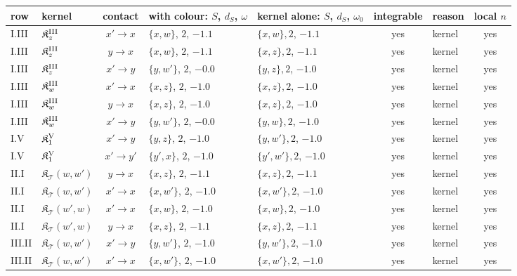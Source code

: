 {\footnotesize
\begin{center}
\renewcommand{\arraystretch}{1.12}\setlength{\tabcolsep}{2pt}
\begin{tabular}{|l|l|c|l|l|c|l|c|}\hline
row & kernel & contact & with colour: $S$, $d_S$, $\omega$ & kernel alone: $S$, $d_S$, $\omega_0$ & integrable & reason & local $n$\\\hline
I.III & $\mathfrak K^{\rm III}_z$ & $x'\to x$ & $\{x,w\}$, $2$, $-1.1$ & $\{x,w\}, 2$, $-1.1$ & yes & kernel & yes\\
I.III & $\mathfrak K^{\rm III}_z$ & $y\to x$ & $\{x,w\}$, $2$, $-1.1$ & $\{x,z\}, 2$, $-1.1$ & yes & kernel & yes\\
I.III & $\mathfrak K^{\rm III}_z$ & $x'\to y$ & $\{y,w'\}$, $2$, $-0.0$ & $\{y,z\}, 2$, $-1.0$ & yes & kernel & yes\\
I.III & $\mathfrak K^{\rm III}_w$ & $x'\to x$ & $\{x,z\}$, $2$, $-1.0$ & $\{x,z\}, 2$, $-1.0$ & yes & kernel & yes\\
I.III & $\mathfrak K^{\rm III}_w$ & $y\to x$ & $\{x,z\}$, $2$, $-1.0$ & $\{x,z\}, 2$, $-1.0$ & yes & kernel & yes\\
I.III & $\mathfrak K^{\rm III}_w$ & $x'\to y$ & $\{y,w'\}$, $2$, $-0.0$ & $\{y,w\}, 2$, $-1.0$ & yes & kernel & yes\\
I.V & $\mathfrak K^{\rm V}_1$ & $x'\to y$ & $\{y,z\}$, $2$, $-1.0$ & $\{y,w'\}, 2$, $-1.0$ & yes & kernel & yes\\
I.V & $\mathfrak K^{\rm V}_1$ & $x'\to y'$ & $\{y',x\}$, $2$, $-1.0$ & $\{y',w'\}, 2$, $-1.0$ & yes & kernel & yes\\
II.I & $\mathfrak K_{\mathcal T}(w,w')$ & $y\to x$ & $\{x,z\}$, $2$, $-1.1$ & $\{x,z\}, 2$, $-1.1$ & yes & kernel & yes\\
II.I & $\mathfrak K_{\mathcal T}(w,w')$ & $x'\to x$ & $\{x,w'\}$, $2$, $-1.0$ & $\{x,w'\}, 2$, $-1.0$ & yes & kernel & yes\\
II.I & $\mathfrak K_{\mathcal T}(w',w)$ & $x'\to x$ & $\{x,w\}$, $2$, $-1.0$ & $\{x,w\}, 2$, $-1.0$ & yes & kernel & yes\\
II.I & $\mathfrak K_{\mathcal T}(w',w)$ & $y\to x$ & $\{x,z\}$, $2$, $-1.1$ & $\{x,z\}, 2$, $-1.1$ & yes & kernel & yes\\
III.II & $\mathfrak K_{\mathcal T}(w,w')$ & $x'\to y$ & $\{y,w'\}$, $2$, $-1.0$ & $\{y,w'\}, 2$, $-1.0$ & yes & kernel & yes\\
III.II & $\mathfrak K_{\mathcal T}(w,w')$ & $x'\to x$ & $\{x,w'\}$, $2$, $-1.0$ & $\{x,w'\}, 2$, $-1.0$ & yes & kernel & yes\\

\end{tabular}
\end{center}}
